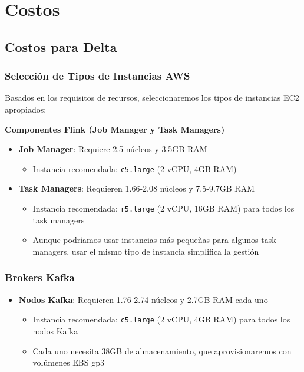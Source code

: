 \section{Costos}

\subsection{Costos para Delta}

\subsubsection{Selección de Tipos de Instancias AWS}

Basados en los requisitos de recursos, seleccionaremos los tipos de instancias EC2 apropiados:

\textbf{Componentes Flink (Job Manager y Task Managers)}

\begin{itemize}
    \item \textbf{Job Manager}: Requiere 2.5 núcleos y 3.5GB RAM
    \begin{itemize}
        \item Instancia recomendada: \texttt{c5.large} (2 vCPU, 4GB RAM)
    \end{itemize}
    
    \item \textbf{Task Managers}: Requieren 1.66-2.08 núcleos y 7.5-9.7GB RAM
    \begin{itemize}
        \item Instancia recomendada: \texttt{r5.large} (2 vCPU, 16GB RAM) para todos los task managers
        \item Aunque podríamos usar instancias más pequeñas para algunos task managers, usar el mismo tipo de instancia simplifica la gestión
    \end{itemize}
\end{itemize}

\subsubsection{Brokers Kafka}

\begin{itemize}
    \item \textbf{Nodos Kafka}: Requieren 1.76-2.74 núcleos y 2.7GB RAM cada uno
    \begin{itemize}
        \item Instancia recomendada: \texttt{c5.large} (2 vCPU, 4GB RAM) para todos los nodos Kafka
        \item Cada uno necesita 38GB de almacenamiento, que aprovisionaremos con volúmenes EBS gp3
    \end{itemize}
\end{itemize}

